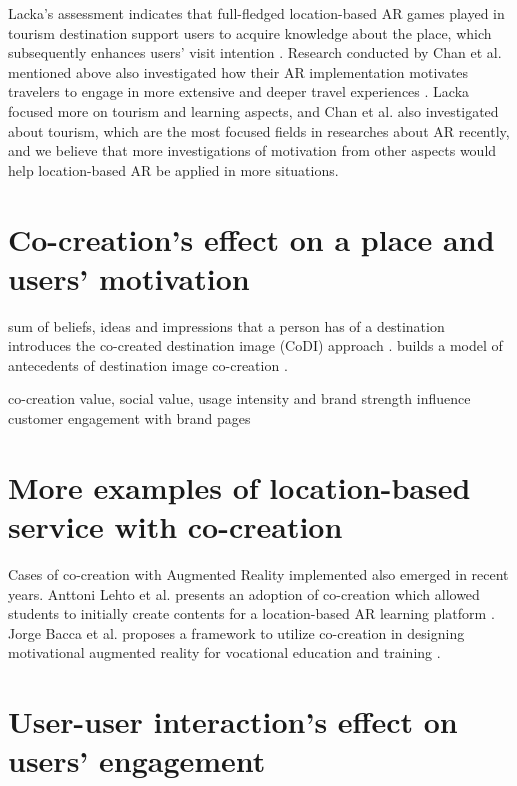 Lacka's assessment indicates that full-fledged location-based AR games played in tourism destination support users to acquire knowledge about the place,
which subsequently enhances users' visit intention \cite{lacka_2018}.
Research conducted by Chan et al. mentioned above also investigated how their AR implementation motivates travelers to engage in more extensive and deeper travel experiences \cite{chan_lin_wang_lu_hsu_2017}.
Lacka focused more on tourism and learning aspects, and Chan et al. also investigated about tourism, which are the most focused fields in researches about AR recently,
and we believe that more investigations of motivation from other aspects would help location-based AR be applied in more situations.

\section{Co-creation's effect on a place and users' motivation}
sum of beliefs, ideas and impressions that a person has of a destination \cite{kotler_haider_rein_2008}\cite{stylidis_cherifi_2018}
introduces the co-created destination image (CoDI) approach \cite{yilmaz_2021}. builds a model of antecedents of destination image co-creation \cite{glyptou_2021}.

co-creation value, social value, usage intensity and brand strength influence customer engagement with brand pages \cite{vries_carlson_2014}


\section{More examples of location-based service with co-creation}
Cases of co-creation with Augmented Reality implemented also emerged in recent years.
Anttoni Lehto et al. presents an adoption of co-creation which allowed students to initially create contents for a location-based AR learning platform \cite{lehto_lautkankare_brander_ala-nissila_saari_salminen_2020}.
Jorge Bacca et al. proposes a framework to utilize co-creation in designing motivational augmented reality for vocational education and training \cite{acosta_navarro_gesa_kinshuk_2019}.

\section{User-user interaction's effect on users' engagement}